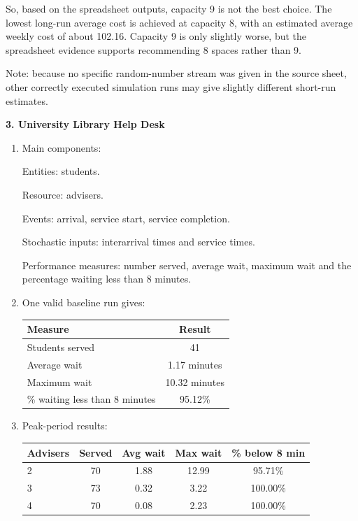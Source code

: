 \documentclass[11pt,a4paper]{article}
\begin{document}
\begin{enumerate}
So, based on the spreadsheet outputs, capacity 9 is not the best choice.
The lowest long-run average cost is achieved at capacity 8, with an estimated average weekly cost of about 102.16.
Capacity 9 is only slightly worse, but the spreadsheet evidence supports recommending 8 spaces rather than 9.

Note: because no specific random-number stream was given in the source sheet, other correctly executed simulation runs may give slightly different short-run estimates.
\end{enumerate}

\newpage

\textbf{3. University Library Help Desk}

\begin{enumerate}
\item Main components:

Entities: students.

Resource: advisers.

Events: arrival, service start, service completion.

Stochastic inputs: interarrival times and service times.

Performance measures: number served, average wait, maximum wait and the percentage waiting less than 8 minutes.

\item One valid baseline run gives:

\begin{center}
\begin{tabular}{lc}
\toprule
Measure & Result \\
\midrule
Students served & 41 \\
Average wait & 1.17 minutes \\
Maximum wait & 10.32 minutes \\
\% waiting less than 8 minutes & 95.12\% \\
\bottomrule
\end{tabular}
\end{center}

\item Peak-period results:

\begin{center}
\begin{tabular}{lcccc}
\toprule
Advisers & Served & Avg wait & Max wait & \% below 8 min \\
\midrule
2 & 70 & 1.88 & 12.99 & 95.71\% \\
3 & 73 & 0.32 & 3.22 & 100.00\% \\
4 & 70 & 0.08 & 2.23 & 100.00\% \\
\bottomrule
\end{tabular}
\end{center}


\end{enumerate}
\end{document}
